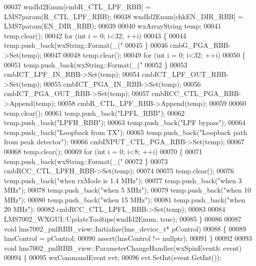 \begin{DoxyCode}
00037     wndId2Enum[cmbR_CTL_LPF_RBB] = LMS7param(R_CTL_LPF_RBB);
00038     wndId2Enum[chkEN_DIR_RBB] = LMS7param(EN_DIR_RBB);
00039 
00040     wxArrayString temp;
00041     temp.clear();
00042     \textcolor{keywordflow}{for} (\textcolor{keywordtype}{int} i = 0; i<32; ++i)
00043     \{
00044         temp.push\_back(wxString::Format(\_(\textcolor{stringliteral}{"%
00045     \}
00046     cmbG_PGA_RBB->Set(temp);
00047 
00048     temp.clear();
00049     \textcolor{keywordflow}{for} (\textcolor{keywordtype}{int} i = 0; i<32; ++i)
00050     \{
00051         temp.push\_back(wxString::Format(\_(\textcolor{stringliteral}{"%
00052     \}
00053     cmbICT_LPF_IN_RBB->Set(temp);
00054     cmbICT_LPF_OUT_RBB->Set(temp);
00055     cmbICT_PGA_IN_RBB->Set(temp);
00056     cmbICT_PGA_OUT_RBB->Set(temp);
00057     cmbRCC_CTL_PGA_RBB->Append(temp);
00058     cmbR_CTL_LPF_RBB->Append(temp);
00059 
00060     temp.clear();
00061     temp.push\_back(\textcolor{stringliteral}{"LPFL\_RBB"});
00062     temp.push\_back(\textcolor{stringliteral}{"LPFH\_RBB"});
00063     temp.push\_back(\textcolor{stringliteral}{"LPF bypass"});
00064     temp.push\_back(\textcolor{stringliteral}{"Loopback from TX"});
00065     temp.push\_back(\textcolor{stringliteral}{"Loopback path from peak detector"});
00066     cmbINPUT_CTL_PGA_RBB->Set(temp);
00067 
00068     temp.clear();
00069     \textcolor{keywordflow}{for} (\textcolor{keywordtype}{int} i = 0; i<8; ++i)
00070     \{
00071         temp.push\_back(wxString::Format(\_(\textcolor{stringliteral}{"%
00072     \}
00073     cmbRCC_CTL_LPFH_RBB->Set(temp);
00074 
00075     temp.clear();
00076     temp.push\_back(\textcolor{stringliteral}{"when rxMode is 1.4 MHz"});
00077     temp.push\_back(\textcolor{stringliteral}{"when 3 MHz"});
00078     temp.push\_back(\textcolor{stringliteral}{"when 5 MHz"});
00079     temp.push\_back(\textcolor{stringliteral}{"when 10 MHz"});
00080     temp.push\_back(\textcolor{stringliteral}{"when 15 MHz"});
00081     temp.push\_back(\textcolor{stringliteral}{"when 20 MHz"});
00082     cmbRCC_CTL_LPFL_RBB->Set(temp);
00083 
00084     LMS7002_WXGUI::UpdateTooltips(wndId2Enum, \textcolor{keyword}{true});
00085 \}
00086 
00087 \textcolor{keywordtype}{void} lms7002_pnlRBB_view::Initialize(lms_device_t* pControl)
00088 \{
00089     lmsControl = pControl;
00090     assert(lmsControl != \textcolor{keyword}{nullptr});
00091 \}
00092 
00093 \textcolor{keywordtype}{void} lms7002_pnlRBB_view::ParameterChangeHandler(wxSpinEvent& event)
00094 \{
00095     wxCommandEvent evt;
00096     evt.SetInt(event.GetInt());
}}}
\end{DoxyCode}
